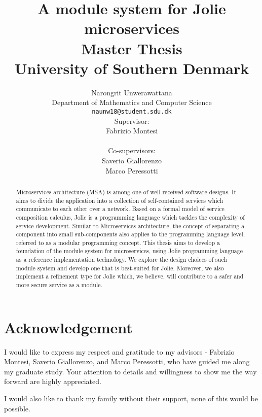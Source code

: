 \documentclass[12pt,openany]{report}
\title{
{A module system for Jolie microservices}\\
{\large Master Thesis}\\
{\large University of Southern Denmark}\\
}
\author{
    Narongrit Unwerawattana\\
    Department of Mathematics and Computer Science\\
    \texttt{naunw18@student.sdu.dk}\vspace{40pt} \\
    Supervisor:\\
    Fabrizio Montesi\\\\
    Co-supervisors:\\
    Saverio Giallorenzo\\
    Marco Peressotti\\
}
\begin{document}
\maketitle

\begin{abstract}
  Microservices architecture (MSA) is among one of well-received software designs. It aims to divide the application into a collection of self-contained services which communicate to each other over a network. Based on a formal model of service composition calculus, Jolie is a programming language which tackles the complexity of service development. Similar to Microservices architecture, the concept of separating a component into small sub-components also applies to the programming language level, referred to as a modular programming concept. This thesis aims to develop a foundation of the module system for microservices, using Jolie programming language as a reference implementation technology. We explore the design choices of such module system and develop one that is best-suited for Jolie. Moreover, we also implement a refinement type for Jolie which, we believe, will contribute to a safer and more secure service as a module.
\end{abstract}

\chapter*{Acknowledgement}
I would like to express my respect and gratitude to my advisors - Fabrizio Montesi, Saverio Giallorenzo, and Marco Peressotti, who have guided me along my graduate study. Your attention to details and willingness to show me the way forward are highly appreciated. 

I would also like to thank my family without their support, none of this would
be possible.

\tableofcontents






\listoffigures
\listoftables

\printbibliography
\end{document}
